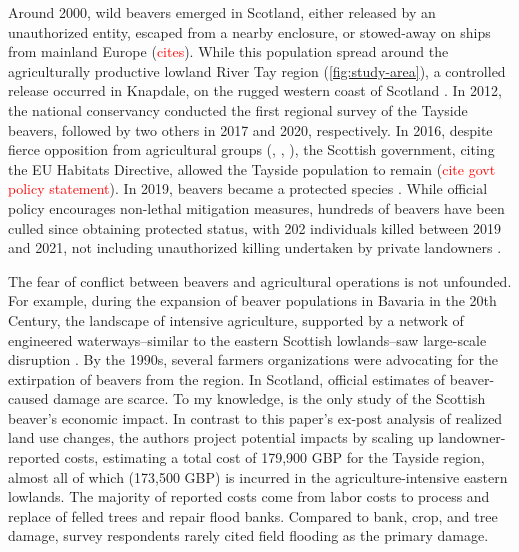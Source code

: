 Around 2000, wild beavers emerged in Scotland, either released by an unauthorized entity, escaped from a nearby enclosure, or stowed-away on ships from mainland Europe (\textcolor{red}{cites}). While this population spread around the agriculturally productive lowland River Tay region (\ref{fig:study-area}), a controlled release occurred in Knapdale, on the rugged western coast of Scotland \citep{campbell-palmer_managing_2015}. In 2012, the national conservancy conducted the first regional survey of the Tayside beavers, followed by two others in 2017 and 2020, respectively. In 2016, despite fierce opposition from agricultural groups (\cite{castle_beavers_2021}, \cite{kennedy_nfu_2023}, \cite{werth_christopher_beavers_2017}), the Scottish government, citing the EU Habitats Directive, allowed the Tayside population to remain (\textcolor{red}{cite govt policy statement}). In 2019, beavers became a protected species \citep{noauthor_beavers_2019}. While official policy encourages non-lethal mitigation measures, hundreds of beavers have been culled since obtaining protected status, with 202 individuals killed between 2019 and 2021, not including unauthorized killing undertaken by private landowners \citep{williams_more_2021}. 

The fear of conflict between beavers and agricultural operations is not unfounded. For example, during the expansion of beaver populations in Bavaria in the 20th Century, the landscape of intensive agriculture, supported by a network of engineered waterways--similar to the eastern Scottish lowlands--saw large-scale disruption \citep{campbell-palmer_managing_2015}. By the 1990s, several farmers organizations were advocating for the extirpation of beavers from the region. In Scotland, official estimates of beaver-caused damage are scarce. To my knowledge, \cite{hamilton_tayside_2015} is the only study of the Scottish beaver's economic impact. In contrast to this paper's ex-post analysis of realized land use changes, the authors project potential impacts by scaling up landowner-reported costs, estimating a total cost of 179,900 GBP for the Tayside region, almost all of which (173,500 GBP) is incurred in the agriculture-intensive eastern lowlands. The majority of reported costs come from labor costs to process and replace of felled trees and repair flood banks. Compared to bank, crop, and tree damage, survey respondents rarely cited field flooding as the primary damage.

